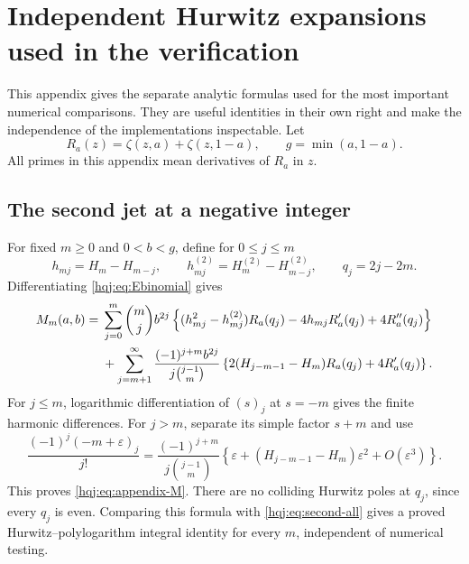 \documentclass[11pt,letterpaper]{article}
\numberwithin{equation}{section}
\theoremstyle{definition}
\begin{document}

\appendix
\section{Independent Hurwitz expansions used in the verification}
\label{hqj:sec:appendix}

This appendix gives the separate analytic formulas used for the most
important numerical comparisons. They are useful identities in their
own right and make the independence of the implementations inspectable.
Let
\[
R_a(z)=\zeta(z,a)+\zeta(z,1-a),\qquad g=\min(a,1-a).
\]
All primes in this appendix mean derivatives of $R_a$ in $z$.

\subsection{The second jet at a negative integer}
For fixed $m\ge0$ and $0<b<g$, define for $0\le j\le m$
\[
h_{mj}=H_m-H_{m-j},\qquad
h_{mj}^{(2)}=H_m^{(2)}-H_{m-j}^{(2)},\qquad q_j=2j-2m.
\]
Differentiating \eqref{hqj:eq:Ebinomial} gives
\begin{align}
M_m(a,b)={}&\sum_{j=0}^m\binom mjb^{2j}
\left\{(h_{mj}^2-h_{mj}^{(2)})R_a(q_j)
-4h_{mj}R_a'(q_j)+4R_a''(q_j)\right\}
\notag\\
&+\sum_{j=m+1}^{\infty}
\frac{(-1)^{j+m}b^{2j}}{j\binom{j-1}{m}}
\left\{2(H_{j-m-1}-H_m)R_a(q_j)+4R_a'(q_j)\right\}.
\label{hqj:eq:appendix-M}
\end{align}
For $j\le m$, logarithmic differentiation of $(s)_j$ at $s=-m$
gives the finite harmonic differences. For $j>m$, separate its simple
factor $s+m$ and use
\[
\frac{(-1)^j(-m+\varepsilon)_j}{j!}
=\frac{(-1)^{j+m}}{j\binom{j-1}{m}}
\left\{\varepsilon+(H_{j-m-1}-H_m)\varepsilon^2+O(\varepsilon^3)\right\}.
\]
This proves \eqref{hqj:eq:appendix-M}. There are no colliding Hurwitz
poles at $q_j$, since every $q_j$ is even. Comparing this formula with
\eqref{hqj:eq:second-all} gives a proved Hurwitz--polylogarithm integral
identity for every $m$, independent of numerical testing.
\end{document}

